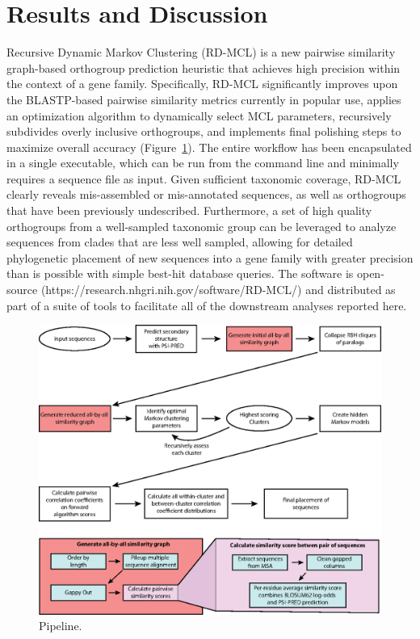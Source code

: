 \documentclass[twocolumn]{bmcart}%
\begin{document}
\section{Results and Discussion}\label{sec:resultsAndDiscussion}
Recursive Dynamic Markov Clustering (RD-MCL) is a new pairwise similarity graph-based orthogroup prediction heuristic that achieves high precision within the context of a gene family.
Specifically, RD-MCL significantly improves upon the BLASTP-based pairwise similarity metrics currently in popular use, applies an optimization algorithm to dynamically select MCL parameters, recursively subdivides overly inclusive orthogroups, and implements final polishing steps to maximize overall accuracy (Figure~\ref{fig:pipeline}).
The entire workflow has been encapsulated in a single executable, which can be run from the command line and minimally requires a sequence file as input.
Given sufficient taxonomic coverage, RD-MCL clearly reveals mis-assembled or mis-annotated sequences, as well as orthogroups that have been previously undescribed.
Furthermore, a set of high quality orthogroups from a well-sampled taxonomic group can be leveraged to analyze sequences from clades that are less well sampled, allowing for detailed phylogenetic placement of new sequences into a gene family with greater precision than is possible with simple best-hit database queries.
The software is open-source (https://research.nhgri.nih.gov/software/RD-MCL/) and distributed as part of a suite of tools to facilitate all of the downstream analyses reported here.

\begin{figure}[t]
  \begin{center}
  \includegraphics[height=0.6\textheight]{../figures/pipeline.eps}
\end{center}
\caption{Pipeline.}
\label{fig:pipeline}
\end{figure}
\end{document}
